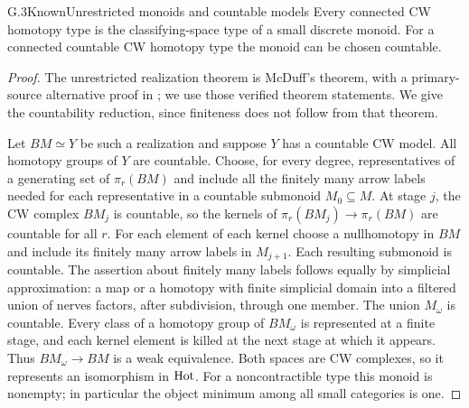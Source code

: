 \begin{claim}{G.3}{Known}{Unrestricted monoids and countable models}
Every connected CW homotopy type is the classifying-space type of a small discrete monoid. For a connected countable CW homotopy type the monoid can be chosen countable.
\end{claim}
\begin{proof}
The unrestricted realization theorem is McDuff's theorem, with a primary-source alternative proof in \citet[Theorems 3.5 and 4.7]{Fiedorowicz1984}; we use those verified theorem statements. We give the countability reduction, since finiteness does not follow from that theorem.

Let $BM\simeq Y$ be such a realization and suppose $Y$ has a countable CW model. All homotopy groups of $Y$ are countable. Choose, for every degree, representatives of a generating set of $\pi_r(BM)$ and include all the finitely many arrow labels needed for each representative in a countable submonoid $M_0\subseteq M$. At stage $j$, the CW complex $BM_j$ is countable, so the kernels of $\pi_r(BM_j)\to\pi_r(BM)$ are countable for all $r$. For each element of each kernel choose a nullhomotopy in $BM$ and include its finitely many arrow labels in $M_{j+1}$. Each resulting submonoid is countable. The assertion about finitely many labels follows equally by simplicial approximation: a map or a homotopy with finite simplicial domain into a filtered union of nerves factors, after subdivision, through one member. The union $M_\omega$ is countable. Every class of a homotopy group of $BM_\omega$ is represented at a finite stage, and each kernel element is killed at the next stage at which it appears. Thus $BM_\omega\to BM$ is a weak equivalence. Both spaces are CW complexes, so it represents an isomorphism in $\mathrm{Hot}$. For a noncontractible type this monoid is nonempty; in particular the object minimum among all small categories is one.
\end{proof}

